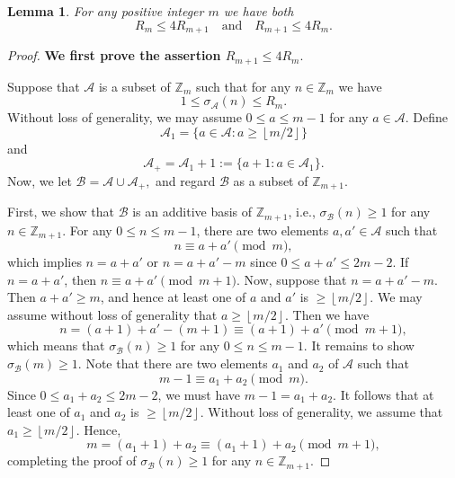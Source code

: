 \documentclass[12pt,a4paper,reqno]{amsart}
\numberwithin{equation}{section}
\newcommand{\floor}[1]{\left\lfloor #1\right\rfloor}
\theoremstyle{plain}
\newtheorem{lemma}{Lemma}
\theoremstyle{definition}
\begin{document}
 \begin{lemma}\label{lem:1}
   For any positive integer $m$ we have both
   $$R_m\le 4R_{m+1} \quad \text{and} \quad R_{m+1}\le 4R_{m}.$$
 \end{lemma}
 \begin{proof}
 {\bf We first prove the assertion $R_{m+1}\le 4R_{m}$}. 

 Suppose that $\mathcal{A}$ is a subset of $\mathbb{Z}_m$ such that for any $n\in \mathbb{Z}_m$ we have
 $$
 1\le \sigma_{\mathcal{A}}(n)\le R_{m}.
 $$
Without loss of generality, we may assume $0\le a\le m-1$ for any $a\in \mathcal{A}$. Define
$$
\mathcal{A}_{1}=\big\{a\in \mathcal{A}: a\ge \floor{m/2}\big\}
$$
and
$$
\mathcal{A}_{+}=\mathcal{A}_{1}+1:=\{a+1: a\in \mathcal{A}_{1}\}.
$$
Now, we let
$
\mathcal{B}=\mathcal{A}\cup \mathcal{A}_{+},
$
and regard $\mathcal{B}$ as a subset of $\mathbb{Z}_{m+1}$.

First, we show that $\mathcal{B}$ is an additive basis of $\mathbb{Z}_{m+1}$, i.e., $\sigma_{\mathcal{B}}(n)\ge 1$ for any $n\in \mathbb{Z}_{m+1}$. For any $0\le n\le m-1$, there are two elements $a, a'\in \mathcal{A}$ such that
$$
n\equiv a+a'\pmod{m},
$$
which implies $n=a+a'$ or $n=a+a'-m$ since $0\le a+a'\le 2m-2$. If $n=a+a'$, then 
$
n\equiv a+a'\pmod{m+1}.
$
Now, suppose that $n=a+a'-m$. Then $a+a'\ge m$, and hence at least one of $a$ and $a'$ is $\ge \floor{m/2}$. We may assume without loss of generality that $a\ge \floor{m/2}$. Then we have
$$
n=(a+1)+a'-(m+1)\equiv (a+1)+a'\pmod{m+1},
$$
which means that $\sigma_{\mathcal{B}}(n)\ge 1$ for any $0\le n\le m-1$. It remains to show $\sigma_{\mathcal{B}}(m)\ge 1$. Note that
there are two elements $a_1$ and $a_2$ of $\mathcal{A}$ such that
$$
m-1\equiv a_1+a_2\pmod{m}.
$$
Since $0\le a_1+a_2\le 2m-2$, we must have $m-1=a_1+a_2$. It follows that at least one of $a_1$ and $a_2$ is $\ge  \floor{m/2}$. Without loss of generality, we assume that $a_1\ge  \floor{m/2}$. Hence,
$$
m=(a_1+1)+a_2 \equiv (a_1+1)+a_2\pmod{m+1},
$$
completing the proof of $\sigma_{\mathcal{B}}(n)\ge 1$ for any $n\in \mathbb{Z}_{m+1}$.


\end{proof}
\end{document}

